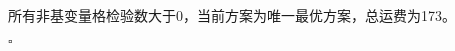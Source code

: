 \documentclass[UTF8]{article}
\newcommand{\edaan}{\hfill $ \square $ \vskip 4mm}
\begin{document}
{\begin{mdframed}
\begin{minipage}[c]{0.5\textwidth}
所有非基变量格检验数大于0，当前方案为{唯一}最优方案，总运费为173。
\end{minipage}
\end{mdframed}

\edaan}
\end{document}
